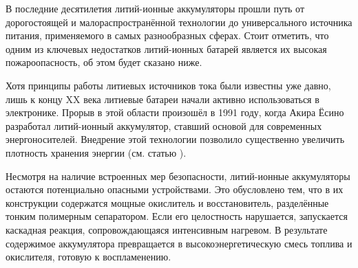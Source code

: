 

















В последние десятилетия литий-ионные аккумуляторы прошли путь от дорогостоящей и малораспространённой технологии 
до универсального источника питания, применяемого в самых разнообразных сферах. 
Стоит отметить, что одним из ключевых недостатков литий-ионных батарей является их высокая пожароопасность, 
об этом будет сказано ниже.

Хотя принципы работы литиевых источников тока были известны уже давно, 
лишь к концу XX века литиевые батареи начали активно использоваться в электронике. 
Прорыв в этой области произошёл в 1991 году, когда Акира Ёсино разработал литий-ионный аккумулятор, 
ставший основой для современных энергоносителей. 
Внедрение этой технологии позволило существенно увеличить плотность хранения энергии (см. статью \cite{admt_201700376}).

Несмотря на наличие встроенных мер безопасности, литий-ионные аккумуляторы остаются потенциально опасными устройствами. 
Это обусловлено тем, что в их конструкции содержатся мощные окислитель и восстановитель, разделённые тонким полимерным сепаратором. 
Если его целостность нарушается, запускается каскадная реакция, сопровождающаяся интенсивным нагревом. 
В результате содержимое аккумулятора превращается в высокоэнергетическую смесь топлива и окислителя, готовую к воспламенению.

